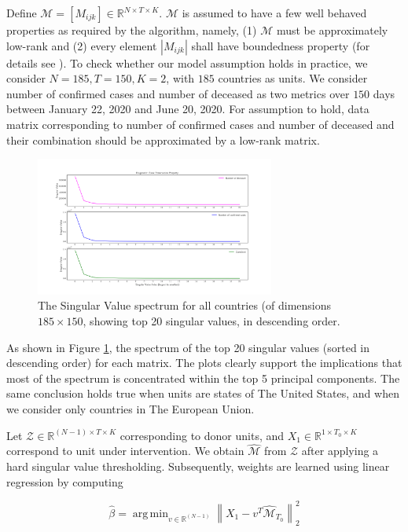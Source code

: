 \documentclass[final,authoryear,5p,times,twocolumn]{elsarticle}
\DeclareMathOperator*{\argmin}{arg\,min}
\begin{document}
	Define $\mathcal{M} = [M_{ijk}] \in \mathbb{R}^{N \times T \times K}$. $\mathcal{M}$ is assumed to have a few well behaved properties as required by the algorithm, namely, (1) $\mathcal{M} $ must be approximately low-rank and (2) every element $\left|M_{ijk}\right|$ shall have boundedness property (for details see \cite{AMSS19}). To check whether our model assumption holds in practice, we consider $N=185, T=150, K=2$, with $185$ countries as units. We consider number of confirmed cases and number of deceased as two metrics over $150$ days between January 22, 2020 and June 20, 2020. For assumption to hold, data matrix corresponding to number of confirmed cases and number of deceased and their combination should be approximated by a low-rank matrix. 
	
	\begin{figure}
		\centering
		\includegraphics[width=0.7\textwidth]{FIG1}
		\caption{The Singular Value spectrum for all countries (of dimensions $185 \times 150$, showing top 20 singular values, in descending order.} 
		\label{fig1} 
	\end{figure}
	
	As shown in Figure \ref{fig1}, the spectrum of the top 20 singular values (sorted in descending order) for each matrix. The plots clearly support the implications that most of the spectrum is concentrated within the top 5 principal components. The same conclusion holds true when units are states of The United States, and when we consider only countries in The  European Union.\par
	
	Let $\mathcal{Z} \in \mathbb{R}^{(N-1) \times T \times K}$ corresponding to donor units, and $X_1 \in \mathbb{R}^{1 \times T_0 \times K}$ correspond to unit under intervention. We obtain $\hat{\mathcal{M}}$ from $\mathcal{Z}$ after applying a hard singular value thresholding. Subsequently, weights are learned using linear regression by computing
	
	\begin{equation*}
	\hat{\beta} = \argmin_{v \in \mathbb{R}^{(N-1)} } \left\| X_1 - v^T \hat{\mathcal{M}}_{T_0}\right\|^2_2
	\end{equation*}
	
\end{document}

